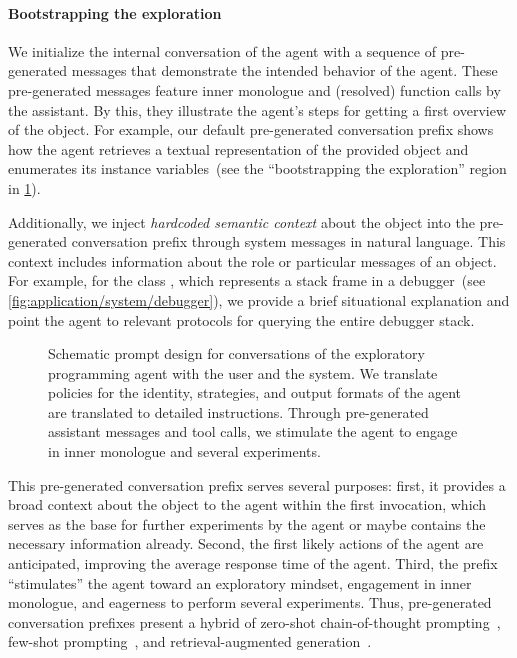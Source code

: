 \paragraph*{Bootstrapping the exploration}
We initialize the internal conversation of the agent with a sequence of pre-generated messages that demonstrate the intended behavior of the agent.
These pre-generated messages feature inner monologue and (resolved) function calls by the assistant.
By this, they illustrate the agent's steps for getting a first overview of the object.
For example, our default pre-generated conversation prefix shows how the agent retrieves a textual representation of the provided object and enumerates its instance variables~(see the ``bootstrapping the exploration'' region in \cref{fig:agent/prompts/design}).

Additionally, we inject \emph{hardcoded semantic context} about the object into the pre-generated conversation prefix through system messages in natural language.
This context includes information about the role or particular messages of an object.
For example, for the class , which represents a stack frame in a debugger~(see \cref{fig:application/system/debugger}), we provide a brief situational explanation and point the agent to relevant protocols for querying the entire debugger stack.

\begin{figure}
	\centering
	\begin{threeparttable}
		\centering
		{\footnotesize
		}
	\end{threeparttable}
	\caption[Schematic prompt design for conversations of the exploratory programming agent with the user and the system.]{
		Schematic prompt design for conversations of the exploratory programming agent with the user and the system.
		We translate policies for the identity, strategies, and output formats of the agent are translated to detailed instructions.
		Through pre-generated assistant messages and tool calls, we stimulate the agent to engage in inner monologue and several experiments.
	}
	\label{fig:agent/prompts/design}
\end{figure}

This pre-generated conversation prefix serves several purposes:
first, it provides a broad context about the object to the agent within the first invocation, which serves as the base for further experiments by the agent or maybe contains the necessary information already.
Second, the first likely actions of the agent are anticipated, improving the average response time of the agent.
Third, the prefix ``stimulates'' the agent toward an exploratory mindset, engagement in inner monologue, and eagerness to perform several experiments.
Thus, pre-generated conversation prefixes present a hybrid of zero-shot chain-of-thought prompting~\cite{kojima2022large}, few-shot prompting~\cite{brown2020language}, and retrieval-augmented generation~\cite{lewis2020retrieval}.
